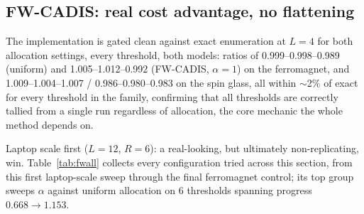 \documentclass[a4paper,fleqn]{cas-sc}
\begin{document}
\subsection{FW-CADIS: real cost advantage, no flattening}\label{sec:fwcadis}
The implementation is gated clean against exact enumeration at $L=4$ for both allocation
settings, every threshold, both models: ratios of 0.999--0.998--0.989 (uniform) and
1.005--1.012--0.992 (FW-CADIS, $\alpha=1$) on the ferromagnet, and 1.009--1.004--1.007 /
0.986--0.980--0.983 on the spin glass, all within $\sim$2\% of exact for every threshold in
the family, confirming that all thresholds are correctly tallied from a single run
regardless of allocation, the core mechanic the whole method depends on.

Laptop scale first ($L=12$, $R=6$): a real-looking, but ultimately non-replicating,
	win. Table~\ref{tab:fwall} collects every configuration tried across this section, from
this first laptop-scale sweep through the final ferromagnet control; its top group sweeps
$\alpha$ against uniform allocation on 6 thresholds spanning progress $0.668\to1.153$.
\end{document}
